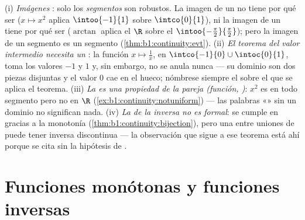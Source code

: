 \begin{remark}
(i) \emph{Imágenes }: solo los \emph{segmentos} son robustos.
La imagen  de un   no tiene por qué ser
 ($x \mapsto x^2$ aplica $\intoo{-1}{1}$ sobre
$\intco{0}{1}$), ni la imagen de un  tiene por qué ser
 ($\arctan$ aplica el  $\R$ sobre el 
$\intoo{-\frac\pi2}{\frac\pi2}$); pero la imagen de un segmento es un
segmento (\cref{thm:b1:continuity:evt}). (ii) \emph{El teorema del
valor intermedio necesita un }: la función
$x \mapsto \frac1x$,  en
$\intco{-1}{0} \cup \intoc{0}{1}$, toma los valores $-1$ y $1$ y, sin
embargo, no se anula nunca --- su dominio son dos piezas disjuntas y
el valor $0$ cae en el hueco; nómbrese siempre el  sobre el
que se aplica el teorema. (iii) \emph{La  es una
propiedad de la pareja (función, )}: $x^2$ es
 en todo segmento pero no en $\R$
(\cref{ex:b1:continuity:notuniform}) --- las palabras
«» sin un dominio no significan nada. (iv)
\emph{La  de la inversa no es formal}: se cumple en
 gracias a la monotonía
(\cref{thm:b1:continuity:bijection}), pero una  
entre uniones de  puede tener inversa discontinua --- la
observación que sigue a ese teorema está ahí porque se cita sin la
hipótesis de .
\end{remark}

\section{Funciones monótonas y funciones inversas}

